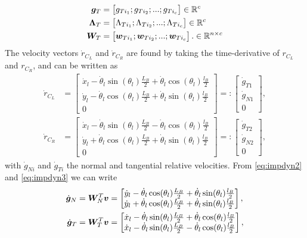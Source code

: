 \documentclass[DC2017114Bouma.tex]{subfiles}
\begin{document}
\begin{align}
{\boldsymbol{g}}_T &= \begin{bmatrix}
g_{Ti_1};g_{Ti_2};...;g_{Ti_c}
\end{bmatrix}\in\mathbb{R}^{c}\\
\boldsymbol{\Lambda}_T &= \begin{bmatrix}
\Lambda_{Ti_1};\Lambda_{Ti_2};...;\Lambda_{Ti_c}
\end{bmatrix}\in\mathbb{R}^{c}\\
{\boldsymbol{W}}_T &= \begin{bmatrix}
{\boldsymbol{w}}_{Ti_1};{\boldsymbol{w}}_{Ti_2};...;{\boldsymbol{w}}_{Ti_c}
\end{bmatrix}.\in\mathbb{R}^{n\times c}
\end{align}
The velocity vectors $\dot{r}_{C_L}$ and $\dot{r}_{C_R}$ are found by taking the time-derivative of $r_{C_L}$ and $r_{C_R}$, and can be written as
\begin{align}
\dot{r}_{C_L} &= \begin{bmatrix}
\dot{x}_l -\dot{\theta}_l\sin(\theta_l)\frac{L_B}{2} + \dot{\theta}_l\cos(\theta_l)\frac{l_B}{2}\\
\dot{y}_l -\dot{\theta}_l\cos(\theta_l)\frac{L_B}{2} + \dot{\theta}_l\sin(\theta_l)\frac{l_B}{2}\\
0
\end{bmatrix}=:\begin{bmatrix}
\dot{g}_{T1}\\
\dot{g}_{N1}\\
0
\end{bmatrix},\label{eq:dotrCL}\\
\dot{r}_{C_R} &= \begin{bmatrix}
\dot{x}_l -\dot{\theta}_l\sin(\theta_l)\frac{L_B}{2} - \dot{\theta}_l\cos(\theta_l)\frac{l_B}{2}\\
\dot{y}_l +\dot{\theta}_l\cos(\theta_l)\frac{L_B}{2} + \dot{\theta}_l\sin(\theta_l)\frac{l_B}{2}\\
0
\end{bmatrix}=:\begin{bmatrix}
\dot{g}_{T2}\\
\dot{g}_{N2}\\
0
\end{bmatrix},\label{eq:dotrCR}
\end{align}
with $\dot{g}_{Ni}$ and $\dot{g}_{Ti}$ the normal and tangential relative velocities. From \eqref{eq:impdyn2} and \eqref{eq:impdyn3} we can write
\begin{align}
\dot{{\boldsymbol{g}}}_N &= {\boldsymbol{W}}_N^T{\boldsymbol{v}} = \begin{bmatrix}
\dot{y}_l -\dot{\theta}_l\cos(\theta_l)\frac{L_B}{2} + \dot{\theta}_l\sin(\theta_l)\frac{l_B}{2}\\
\dot{y}_l +\dot{\theta}_l\cos(\theta_l)\frac{L_B}{2} + \dot{\theta}_l\sin(\theta_l)\frac{l_B}{2}
\end{bmatrix},\\
\dot{{\boldsymbol{g}}}_T &= {\boldsymbol{W}}_T^T{\boldsymbol{v}} = \begin{bmatrix}
\dot{x}_l -\dot{\theta}_l\sin(\theta_l)\frac{L_B}{2} + \dot{\theta}_l\cos(\theta_l)\frac{l_B}{2}\\
\dot{x}_l -\dot{\theta}_l\sin(\theta_l)\frac{L_B}{2} - \dot{\theta}_l\cos(\theta_l)\frac{l_B}{2}
\end{bmatrix},
\end{align}
\end{document}
